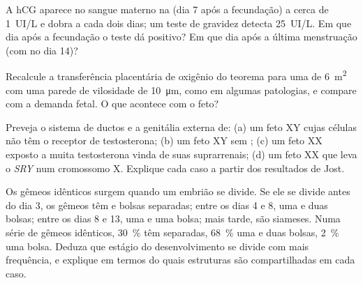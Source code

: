 \begin{exercise}[$\star\star$]\label{exo:b2:mammal-reproduction:8}
A hCG aparece no sangue materno na  (dia 7 após a
fecundação) a cerca de \qty{1}{UI/L} e dobra a cada dois dias; um teste
de gravidez detecta \qty{25}{UI/L}. Em que dia após a fecundação o
teste dá positivo? Em que dia após a última menstruação (com 
no dia 14)?
\end{exercise}

\begin{exercise}[$\star\star$]\label{exo:b2:mammal-reproduction:9}
Recalcule a transferência placentária de oxigênio do teorema para uma
 de \qty{6}{m^2} com uma parede de vilosidade de
\qty{10}{\micro m}, como em algumas patologias, e compare com a demanda
fetal. O que acontece com o feto?
\end{exercise}

\begin{exercise}[$\star\star\star$]\label{exo:b2:mammal-reproduction:10}
Preveja o sistema de ductos e a genitália externa de: (a) um feto XY
cujas células não têm o receptor de testosterona; (b) um feto XY sem
; (c) um feto XX exposto a muita testosterona
vinda de suas suprarrenais; (d) um feto XX que leva o \emph{SRY} num
cromossomo X. Explique cada caso a partir dos resultados de Jost.
\end{exercise}

\begin{exercise}[$\star\star\star$]\label{exo:b2:mammal-reproduction:11}
Os gêmeos idênticos surgem quando um embrião se divide. Se ele se
divide antes do dia 3, os gêmeos têm  e bolsas separadas;
entre os dias 4 e 8, uma  e duas bolsas; entre os dias 8 e 13,
uma  e uma bolsa; mais tarde, são siameses. Numa série de
gêmeos idênticos, \qty{30}{\%} têm  separadas, \qty{68}{\%}
uma  e duas bolsas, \qty{2}{\%} uma bolsa. Deduza que estágio
do desenvolvimento se divide com mais frequência, e explique em
termos do  quais estruturas são compartilhadas em cada caso.
\end{exercise}

